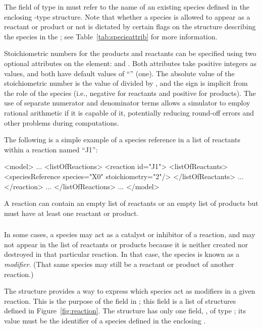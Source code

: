 \documentclass[10pt,twocolumntoc]{cekarticle}
\newcommand{\vref}[1]{\ref{#1}}
\begin{document}
The field  of type  in 
must refer to the name of an existing species defined in the enclosing
-type structure.  Note that whether a species is allowed to
appear as a reactant or product or not is dictated by certain flags on the
structure describing the species in the ; see
Table~\ref{tab:specieattrib} for more information.

Stoichiometric numbers for the products and reactants can be specified
using two optional attributes on the  element:
 and .  Both attributes take
positive integers as values, and both have default values of ``''
(one).  The absolute value of the stoichiometric number is the value of
 divided by , and the sign is
implicit from the role of the species (i.e., negative for reactants and
positive for products).  The use of separate numerator and denominator
terms allows a simulator to employ rational arithmetic if it is capable of
it, potentially reducing round-off errors and other problems during
computations.

The following is a simple example of a species reference in a list
of reactants within a reaction named ``J1'':
\begin{example}
<model>
    ...
    <listOfReactions>
        <reaction id="J1">
            <listOfReactants>
                <speciesReference species="X0" stoichiometry="2"/>
            </listOfReactants>
            ...
        </reaction>
        ...
    </listOfReactions>
    ...
</model>
\end{example}

A reaction can contain an empty list of reactants or an empty list
of products but must have at least one reactant or product.

\subsubsection{}
\label{subsec:modifierreference}

In some cases, a species may act as a catalyst or inhibitor of a reaction,
and may not appear in the list of reactants or products because it is
neither created nor destroyed in that particular reaction.  In that case,
the species is known as a \emph{modifier}.  (That same species may still be
a reactant or product of another reaction.)

The  structure provides a way to express which species act
as modifiers in a given reaction.  This is the purpose of the
 field in ; this field is a list of
 structures defined in
Figure~\vref{fig:reaction}.  The  structure
has only one field, , of type ; its value must
be the identifier of a species defined in the enclosing .
\end{document}
